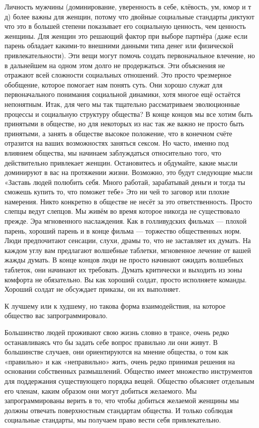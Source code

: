 \RULE  Личность мужчины (доминирование, уверенность в себе, клёвость, ум, юмор и т д) более важны для женщин, потому что двойные социальные стандарты диктуют что это в большей степени показывает его социальную ценность, чем ценность женщины. Для женщин это решающий фактор при выборе партнёра (даже если парень обладает какими-то внешними данными типа денег или физической привлекательности). Эти вещи могут помочь создать первоначальное влечение, но в дальнейшем на одном этом долго не продержаться. Эти объяснения не отражают всей сложности социальных отношений. Это просто чрезмерное обобщение, которое помогает нам понять суть. Они хорошо служат для первоначального понимания социальной динамики, хотя многое ещё остаётся непонятным. Итак, для чего мы так тщательно рассматриваем эволюционные процессы и социальную структуру общества? В конце концов мы все хотим быть принятыми в обществе, но для некоторых из нас так же важно не просто быть принятыми, а занять в обществе высокое положение, что в конечном счёте отразится на ваших возможностях заняться сексом. Но часто, именно под влиянием общества, мы начинаем заблуждаться относительно того, что действительно привлекает женщин. Остановитесь и обдумайте, какие мысли доминируют в вас на протяжении жизни. Возможно, это будут следующие мысли «Заставь людей полюбить себя. Много работай, зарабатывай деньги и тогда ты сможешь купить то, что поможет тебе» Это ни чей то заговор или плохие намерения. Никто конкретно в обществе не несёт за это ответственность. Просто слепцы ведут слепцов. Мы живём во время которое никогда не существовало прежде. Эра мгновенного наслаждения. Как в голливудских фильмах --- плохой парень, хороший парень и в конце фильма --- торжество общественных норм. Люди предпочитают сенсации, слухи, драмы то, что не заставляет их думать. На каждом углу вам предлагают волшебные таблетки, мгновенное лечение от вашей жажды думать. В конце концов люди не просто начинают ожидать волшебных таблеток, они начинают их требовать. Думать критически и выходить из зоны комфорта не обязательно. Вы как хороший солдат, просто исполняете команды. Хороший солдат не обсуждает приказы, он их выполняет.

К лучшему или к худшему, но такова форма взаимодействия, на которое общество вас запрограммировало.

\RULE  Большинство людей проживают свою жизнь словно в трансе, очень редко останавливаясь что бы задать себе вопрос правильно ли они живут. В большинстве случаев, они ориентируются на мнение общества, о том как «правильно» и как «неправильно» жить, очень редко принимая решения на основании собственных размышлений. Общество имеет множество инструментов для поддержания существующего порядка вещей. Общество объясняет отдельным его членам, каким образом они могут добиться желаемого. Мы запрограммированы верить в то, что чтобы добиться желаемой женщины мы должны отвечать поверхностным стандартам общества. И только соблюдая социальные стандарты, мы получаем право вести себя привлекательно.

